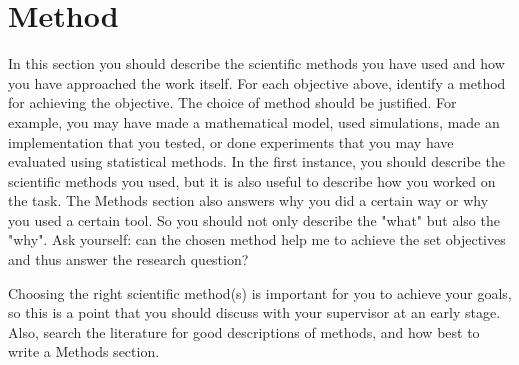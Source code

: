 \section{Method} 
\label{sec:method}

In this section you should describe the scientific methods you have used and how you have approached the work itself. For each objective above, identify a method for achieving the objective. The choice of method should be justified. For example, you may have made a mathematical model, used simulations, made an implementation that you tested, or done experiments that you may have evaluated using statistical methods. In the first instance, you should describe the scientific methods you used, but it is also useful to describe how you worked on the task. The Methods section also answers why you did a certain way or why you used a certain tool. So you should not only describe the "what" but also the "why". Ask yourself: can the chosen method help me to achieve the set objectives and thus answer the research question?

Choosing the right scientific method(s) is important for you to achieve your goals, so this is a point that you should discuss with your supervisor at an early stage. Also, search the literature for good descriptions of methods, and how best to write a Methods section. 
